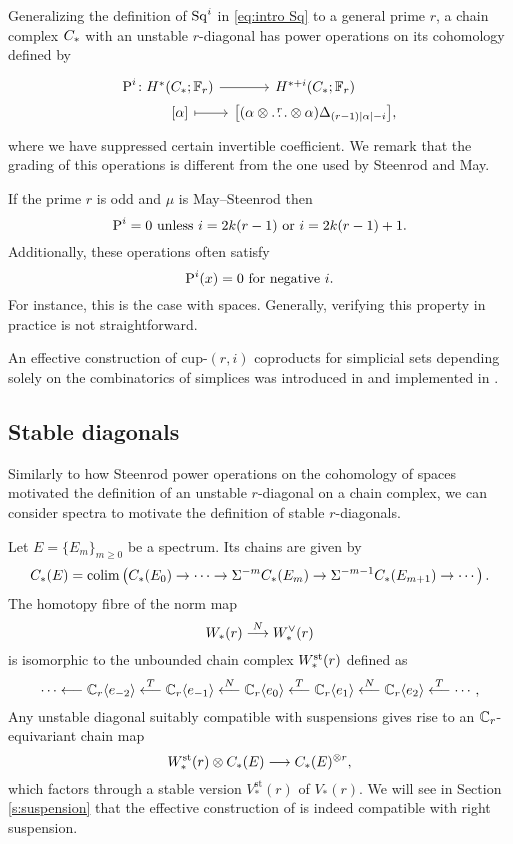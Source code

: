 Generalizing the definition of $\operatorname{Sq}^i$ in \cref{eq:intro Sq} to a general prime $r$, a chain complex $C_{*}$ with an unstable $r$-diagonal has power operations on its cohomology defined by
\begin{equation}\label{eq:intro P}
	\begin{tikzcd}[column sep=tiny, row sep=0]
		\power^i \colon &[-15pt] H^*(\ucadenas;\bF_r) \arrow[r] & H^{*+i}(\ucadenas;\bF_r) \\
		& {[\alpha]} \arrow[r, mapsto] & \big{[}(\alpha \ot \overset{r}{\dots} \ot \alpha)\Delta_{(r-1)\bars{\alpha}-i}\big{]},
	\end{tikzcd}
\end{equation}
where we have suppressed certain invertible coefficient.
We remark that the grading of this operations is different from the one used by Steenrod and May.

If the prime $r$ is odd and $\mu$ is May--Steenrod then
\[
\operatorname{P}^i = 0 \text{ unless } i = 2k(r-1) \text{ or }i = 2k(r-1)+1.
\]
Additionally, these operations often satisfy
\[
\operatorname{P}^i(x) = 0 \text{ for negative } i.
\]
For instance, this is the case with spaces.
Generally, verifying this property in practice is not straightforward.

An effective construction of cup-$(r,i)$ coproducts for simplicial sets depending solely on the combinatorics of simplices was introduced in \cite{medina2021may_st} and implemented in \cite{medina2021comch}.

\subsection{Stable diagonals}

Similarly to how Steenrod power operations on the cohomology of spaces motivated the definition of an unstable $r$-diagonal on a chain complex, we can consider spectra to motivate the definition of stable $r$-diagonals.

Let $E = \{E_m\}_{m \geq 0}$ be a spectrum. Its chains are given by
\[
C_{*}(E) = \operatorname*{colim} \left(C_{*}(E_0) \to \dots \to \Sigma^{-m}C_{*}(E_m) \to \Sigma^{-m-1} C_{*}(E_{m+1}) \to \dotsb\right).
\]
The homotopy fibre of the norm map
\[
W_{*}(r) \overset{N}{\longrightarrow} W^\vee_{*}(r)
\]
is isomorphic to the unbounded chain complex $W^{\mathrm{st}}_{*}(r)$ defined as
\[
\dotsb \longleftarrow \mathbb{C}_r\langle e_{-2}\rangle
\overset{T}{\longleftarrow}
\mathbb{C}_r\langle e_{-1}\rangle
\overset{N}{\longleftarrow}
\mathbb{C}_r\langle e_0\rangle
\overset{T}{\longleftarrow}
\mathbb{C}_r\langle e_{1}\rangle
\overset{N}{\longleftarrow}
\mathbb{C}_r\langle e_{2}\rangle
\overset{T}{\longleftarrow}
\dotsb,
\]
Any unstable diagonal suitably compatible with suspensions gives rise to an $\mathbb{C}_r$-equivariant chain map
\[
W^{\mathrm{st}}_{*}(r) \otimes C_{*}(E) \longrightarrow C_{*}(E)^{\otimes r},
\]
which factors through a stable version $V_*^\mathrm{st}(r)$ of $V_*(r)$. We will see in Section \ref{s:suspension} that the effective construction of \cite{medina2021may_st} is indeed compatible with right suspension.

